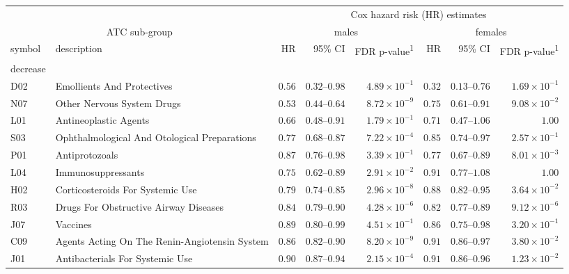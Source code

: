 \captionsetup[table]{labelformat=empty,skip=1pt}
\setlength{\LTpost}{0mm}
\begin{longtable}{llrrrrrr}
\toprule
 &  & \multicolumn{6}{c}{Cox hazard risk (HR) estimates} \\ 
\cmidrule(lr){3-8}
\multicolumn{2}{c}{ATC sub-group} & \multicolumn{3}{c}{males} & \multicolumn{3}{c}{females} \\ 
\cmidrule(lr){1-2} \cmidrule(lr){3-5} \cmidrule(lr){6-8}
symbol & description & HR & 95\% CI & FDR p-value\textsuperscript{1} & HR & 95\% CI & FDR p-value\textsuperscript{1} \\ 
\midrule
\multicolumn{1}{l}{decrease} \\ 
\midrule
D02 & Emollients And Protectives & $0.56$ & $0.32$–$0.98$ & $4.89 \times 10^{-1}$ & $0.32$ & $0.13$–$0.76$ & $1.69 \times 10^{-1}$ \\ 
N07 & Other Nervous System Drugs & $0.53$ & $0.44$–$0.64$ & $8.72 \times 10^{-9}$ & $0.75$ & $0.61$–$0.91$ & $9.08 \times 10^{-2}$ \\ 
L01 & Antineoplastic Agents & $0.66$ & $0.48$–$0.91$ & $1.79 \times 10^{-1}$ & $0.71$ & $0.47$–$1.06$ & $1.00$ \\ 
S03 & Ophthalmological And Otological Preparations & $0.77$ & $0.68$–$0.87$ & $7.22 \times 10^{-4}$ & $0.85$ & $0.74$–$0.97$ & $2.57 \times 10^{-1}$ \\ 
P01 & Antiprotozoals & $0.87$ & $0.76$–$0.98$ & $3.39 \times 10^{-1}$ & $0.77$ & $0.67$–$0.89$ & $8.01 \times 10^{-3}$ \\ 
L04 & Immunosuppressants & $0.75$ & $0.62$–$0.89$ & $2.91 \times 10^{-2}$ & $0.91$ & $0.77$–$1.08$ & $1.00$ \\ 
H02 & Corticosteroids For Systemic Use & $0.79$ & $0.74$–$0.85$ & $2.96 \times 10^{-8}$ & $0.88$ & $0.82$–$0.95$ & $3.64 \times 10^{-2}$ \\ 
R03 & Drugs For Obstructive Airway Diseases & $0.84$ & $0.79$–$0.90$ & $4.28 \times 10^{-6}$ & $0.82$ & $0.77$–$0.89$ & $9.12 \times 10^{-6}$ \\ 
J07 & Vaccines & $0.89$ & $0.80$–$0.99$ & $4.51 \times 10^{-1}$ & $0.86$ & $0.75$–$0.98$ & $3.20 \times 10^{-1}$ \\ 
C09 & Agents Acting On The Renin-Angiotensin System & $0.86$ & $0.82$–$0.90$ & $8.20 \times 10^{-9}$ & $0.91$ & $0.86$–$0.97$ & $3.80 \times 10^{-2}$ \\ 
J01 & Antibacterials For Systemic Use & $0.90$ & $0.87$–$0.94$ & $2.15 \times 10^{-4}$ & $0.91$ & $0.86$–$0.96$ & $1.23 \times 10^{-2}$ \\ 

\end{longtable}
